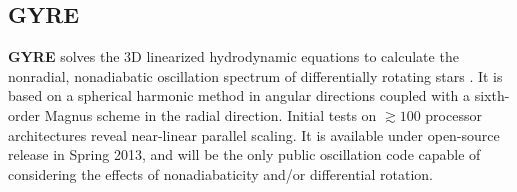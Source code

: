    
    
    
{\color{brown}    
\subsection{GYRE}}
  
\textbf{GYRE} solves the 3D linearized hydrodynamic
equations to calculate the nonradial, nonadiabatic oscillation
spectrum of differentially rotating stars \citep{bard11}. It is based
on a spherical harmonic method in angular directions coupled with a
sixth-order Magnus scheme in the radial direction. Initial tests on
$\gtrsim 100$ processor architectures reveal near-linear parallel
scaling. It is available under open-source release in
Spring 2013, and will be the only public oscillation code capable of
considering the effects of nonadiabaticity and/or differential
rotation.

    
